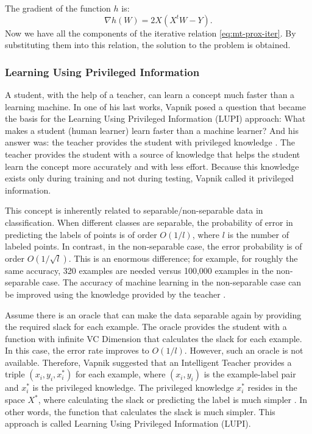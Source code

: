 \documentclass[12pt]{article}
\begin{document}
	The gradient of the function $h$ is:
	\begin{equation}
		\nabla h(W) = 2X(X^t W - Y).
	\end{equation}
	Now we have all the components of the iterative relation \eqref{eq:mt-prox-iter}. By substituting them into this relation, the solution to the problem is obtained.
	
	\subsubsection{Learning Using Privileged Information}
	A student, with the help of a teacher, can learn a concept much faster than a learning machine. In one of his last works, Vapnik posed a question that became the basis for the Learning Using Privileged Information (LUPI) approach: What makes a student (human learner) learn faster than a machine learner? And his answer was: the teacher provides the student with privileged knowledge \cite{vapnik2015learning}. The teacher provides the student with a source of knowledge that helps the student learn the concept more accurately and with less effort. Because this knowledge exists only during training and not during testing, Vapnik called it privileged information.
	
	This concept is inherently related to separable/non-separable data in classification. When different classes are separable, the probability of error in predicting the labels of points is of order $O(1/l)$, where $l$ is the number of labeled points. In contrast, in the non-separable case, the error probability is of order $O(1/\sqrt{l})$. This is an enormous difference; for example, for roughly the same accuracy, 320 examples are needed versus 100,000 examples in the non-separable case. The accuracy of machine learning in the non-separable case can be improved using the knowledge provided by the teacher \cite{vapnik2015learning}.
	
	Assume there is an oracle that can make the data separable again by providing the required slack for each example. The oracle provides the student with a function with infinite VC Dimension that calculates the slack for each example. In this case, the error rate improves to $O(1/l)$. However, such an oracle is not available. Therefore, Vapnik suggested that an Intelligent Teacher provides a triple $(x_i, y_i, x_i^*)$ for each example, where $(x_i, y_i)$ is the example-label pair and $x_i^*$ is the privileged knowledge. The privileged knowledge $x_i^*$ resides in the space $X^*$, where calculating the slack or predicting the label is much simpler \cite{vapnik2015learning}. In other words, the function that calculates the slack is much simpler. This approach is called Learning Using Privileged Information (LUPI).
	
\end{document}
